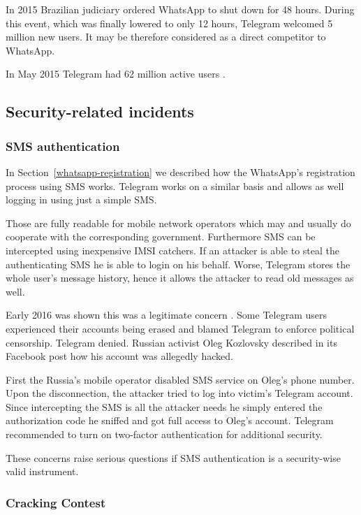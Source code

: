 \documentclass[thesis=M,english]{FITthesis}[2012/10/20]
\begin{document}
In 2015 Brazilian judiciary ordered WhatsApp to shut down for 48 hours. During this event, which was finally lowered to only 12 hours, Telegram welcomed 5 million new users.\cite{whatsappbrazil} It may be therefore considered as a direct competitor to WhatsApp.

In May 2015 Telegram had 62 million active users \cite{telegram-users}.


\subsection{Security-related incidents}

\subsubsection{SMS authentication}

In Section~\ref{whatsapp-registration} we described how the WhatsApp's registration process using SMS works. Telegram works on a similar basis and allows as well logging in using just a simple SMS.

Those are fully readable for mobile network operators which may and usually do cooperate with the corresponding government. Furthermore SMS can be intercepted using inexpensive IMSI catchers. If an attacker is able to steal the authenticating SMS he is able to login on his behalf. Worse, Telegram stores the whole user's message history, hence it allows the attacker to read old messages as well.

Early 2016 was shown this was a legitimate concern \cite{telegram-smsiran}. Some Telegram users experienced their accounts being erased and blamed Telegram to enforce political censorship. Telegram denied. Russian activist Oleg Kozlovsky described in its Facebook post \cite{telegram-russia} how his account was allegedly hacked.

First the Russia's mobile operator disabled SMS service on Oleg's phone number. Upon the disconnection, the attacker tried to log into victim's Telegram account. Since intercepting the SMS is all the attacker needs he simply entered the authorization code he sniffed and got full access to Oleg's account. Telegram recommended to turn on two-factor authentication for additional security.

These concerns raise serious questions if SMS authentication is a security-wise valid instrument.

\subsubsection{Cracking Contest}
\end{document}

